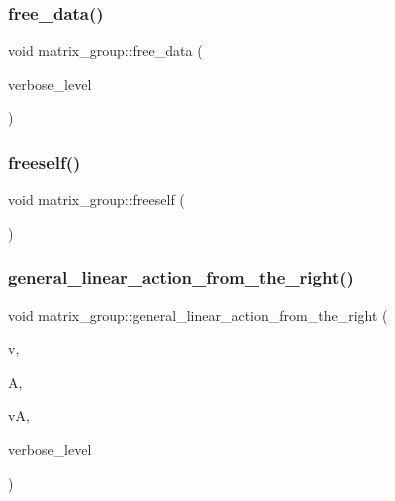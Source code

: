 \mbox{\label{classmatrix__group_a83389b30940eb37203b0559d31e74e34}} 
\subsubsection{\texorpdfstring{free\+\_\+data()}{free\_data()}}
{\footnotesize\ttfamily void matrix\+\_\+group\+::free\+\_\+data (\begin{DoxyParamCaption}\item[{\mbox{\hyperlink{galois_8h_a09fddde158a3a20bd2dcadb609de11dc}{I\+NT}}}]{verbose\+\_\+level }\end{DoxyParamCaption})}

\mbox{\label{classmatrix__group_a961d53d2f9c72765f5d357ab4b310381}} 
\subsubsection{\texorpdfstring{freeself()}{freeself()}}
{\footnotesize\ttfamily void matrix\+\_\+group\+::freeself (\begin{DoxyParamCaption}{ }\end{DoxyParamCaption})}

\mbox{\label{classmatrix__group_a889580a8a77a61365a371b76d108dc03}} 
\subsubsection{\texorpdfstring{general\+\_\+linear\+\_\+action\+\_\+from\+\_\+the\+\_\+right()}{general\_linear\_action\_from\_the\_right()}}
{\footnotesize\ttfamily void matrix\+\_\+group\+::general\+\_\+linear\+\_\+action\+\_\+from\+\_\+the\+\_\+right (\begin{DoxyParamCaption}\item[{\mbox{\hyperlink{galois_8h_a09fddde158a3a20bd2dcadb609de11dc}{I\+NT}} $\ast$}]{v,  }\item[{\mbox{\hyperlink{galois_8h_a09fddde158a3a20bd2dcadb609de11dc}{I\+NT}} $\ast$}]{A,  }\item[{\mbox{\hyperlink{galois_8h_a09fddde158a3a20bd2dcadb609de11dc}{I\+NT}} $\ast$}]{vA,  }\item[{\mbox{\hyperlink{galois_8h_a09fddde158a3a20bd2dcadb609de11dc}{I\+NT}}}]{verbose\+\_\+level }\end{DoxyParamCaption})}

